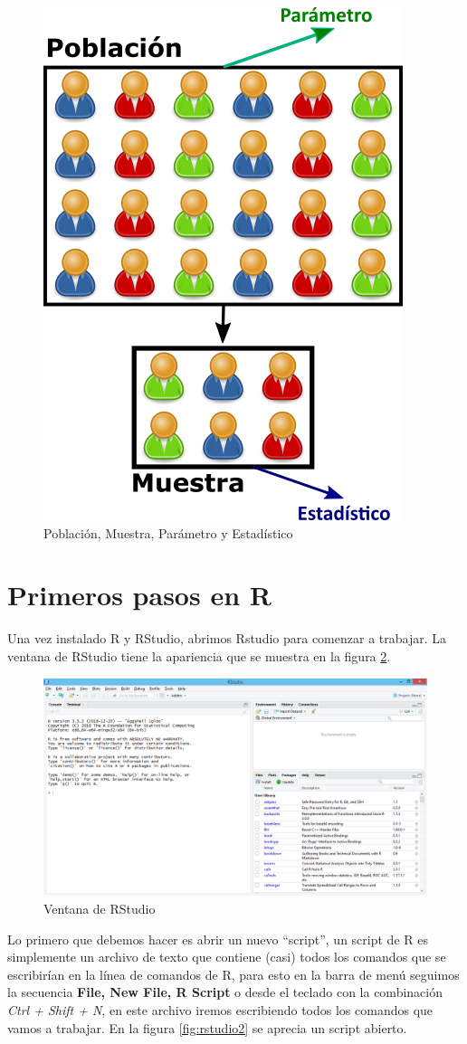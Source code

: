\documentclass[letterpaper,]{book}
\begin{document}
\begin{figure}[h!]

{\centering \includegraphics[width=0.5\linewidth]{popsample} 

}

\caption{Población, Muestra, Parámetro y Estadístico}\label{fig:popsample}
\end{figure}

\hypertarget{primerR}{%
\section{Primeros pasos en R}\label{primerR}}

Una vez instalado R y RStudio, abrimos Rstudio para comenzar a trabajar. La ventana de RStudio tiene la apariencia que se muestra en la figura \ref{fig:rstudio1}.

\begin{figure}[h!]

{\centering \includegraphics[width=0.5\linewidth]{rstudio1} 

}

\caption{Ventana de RStudio}\label{fig:rstudio1}
\end{figure}

Lo primero que debemos hacer es abrir un nuevo ``script'', un script de R es simplemente un archivo de texto que contiene (casi) todos los comandos que se escribirían en la línea de comandos de R, para esto en la barra de menú seguimos la secuencia \textbf{File, New File, R Script} o desde el teclado con la combinación \emph{Ctrl + Shift + N}, en este archivo iremos escribiendo todos los comandos que vamos a trabajar. En la figura \ref{fig:rstudio2} se aprecia un script abierto.
\end{document}
